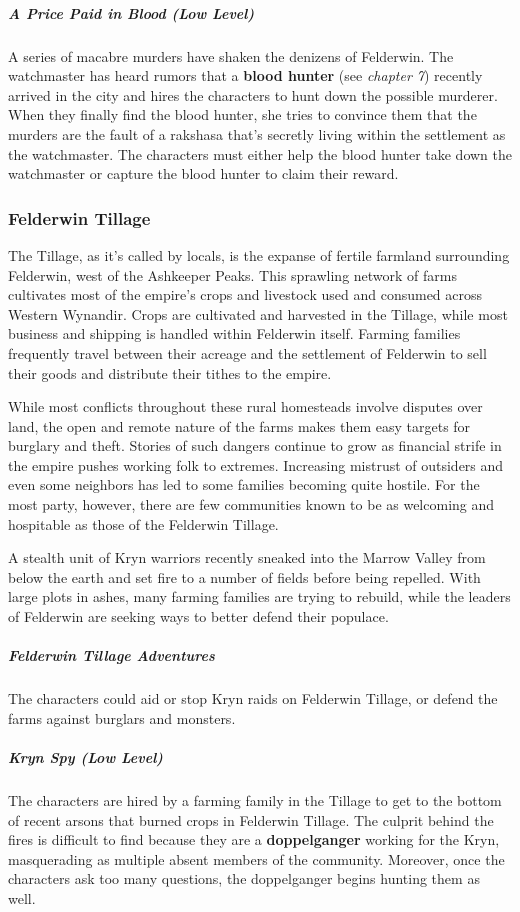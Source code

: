 \documentclass[10pt,a4paper,twoside,bg=print,twocolumn,openany,nodeprecatedcode]{dndbook}
\begin{document}
\subparagraph{A Price Paid in Blood (Low Level)}
A series of macabre murders have shaken the denizens of Felderwin. The watchmaster has heard rumors that a \textbf{blood hunter} (see \textit{chapter 7}) recently arrived in the city and hires the characters to hunt down the possible murderer. When they finally find the blood hunter, she tries to convince them that the murders are the fault of a rakshasa that's secretly living within the settlement as the watchmaster. The characters must either help the blood hunter take down the watchmaster or capture the blood hunter to claim their reward.

\subsubsection{Felderwin Tillage}
The Tillage, as it's called by locals, is the expanse of fertile farmland surrounding Felderwin, west of the Ashkeeper Peaks. This sprawling network of farms cultivates most of the empire's crops and livestock used and consumed across Western Wynandir. Crops are cultivated and harvested in the Tillage, while most business and shipping is handled within Felderwin itself. Farming families frequently travel between their acreage and the settlement of Felderwin to sell their goods and distribute their tithes to the empire.

While most conflicts throughout these rural homesteads involve disputes over land, the open and remote nature of the farms makes them easy targets for burglary and theft. Stories of such dangers continue to grow as financial strife in the empire pushes working folk to extremes. Increasing mistrust of outsiders and even some neighbors has led to some families becoming quite hostile. For the most party, however, there are few communities known to be as welcoming and hospitable as those of the Felderwin Tillage.

A stealth unit of Kryn warriors recently sneaked into the Marrow Valley from below the earth and set fire to a number of fields before being repelled. With large plots in ashes, many farming families are trying to rebuild, while the leaders of Felderwin are seeking ways to better defend their populace.

\subparagraph{Felderwin Tillage Adventures}
The characters could aid or stop Kryn raids on Felderwin Tillage, or defend the farms against burglars and monsters.

\subparagraph{Kryn Spy (Low Level)}
The characters are hired by a farming family in the Tillage to get to the bottom of recent arsons that burned crops in Felderwin Tillage. The culprit behind the fires is difficult to find because they are a \textbf{doppelganger} working for the Kryn, masquerading as multiple absent members of the community. Moreover, once the characters ask too many questions, the doppelganger begins hunting them as well.
\end{document}

